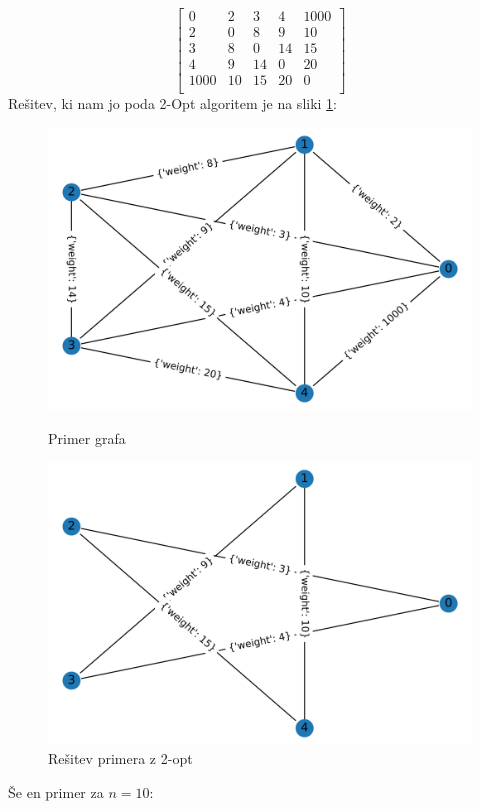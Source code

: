 \documentclass[12pt, a4paper]{article}
\begin{document}
\begin{equation}
\label{matrika}
\begin{bmatrix} 
0&2&3&4&1000\\
2&0&8&9&10\\
3&8&0&14&15\\
4&9&14&0&20\\
1000&10&15&20&0\\
\end{bmatrix}
\end{equation}
\vspace{5mm}
Rešitev, ki nam jo poda 2-Opt algoritem je na sliki \ref{resitev_2_opt}:

\begin{figure}[!h]
    
    \begin{minipage}{0.5\textwidth}
    \includegraphics[width=7 cm]{primeri/primer1.png}
    \caption{Primer grafa}
    \label{primeri/primer1.png}
  \end{minipage}
 \hspace{1cm}
  \begin{minipage}{0.5\textwidth}
    \includegraphics[width=7 cm]{primeri/primer1_2opt.png}
    \caption{Rešitev primera z 2-opt}
    \label{resitev_2_opt}
  \end{minipage}
    
\end{figure}

Še en primer za $n=10$:
\end{document}
